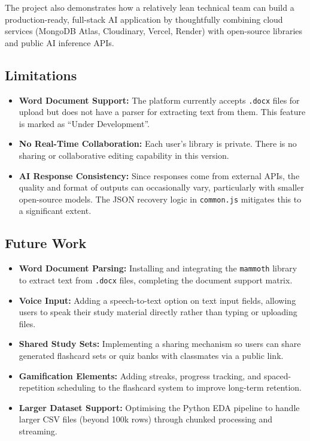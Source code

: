 \documentclass[12pt,a4paper]{article}
\begin{document}
The project also demonstrates how a relatively lean technical team can build a production-ready, full-stack AI application by thoughtfully combining cloud services (MongoDB Atlas, Cloudinary, Vercel, Render) with open-source libraries and public AI inference APIs.

\subsection{Limitations}

\begin{itemize}
    \item \textbf{Word Document Support:} The platform currently accepts \texttt{.docx} files for upload but does not have a parser for extracting text from them. This feature is marked as ``Under Development''.
    \item \textbf{No Real-Time Collaboration:} Each user's library is private. There is no sharing or collaborative editing capability in this version.
    \item \textbf{AI Response Consistency:} Since responses come from external APIs, the quality and format of outputs can occasionally vary, particularly with smaller open-source models. The JSON recovery logic in \texttt{common.js} mitigates this to a significant extent.
\end{itemize}

\subsection{Future Work}

\begin{itemize}
    \item \textbf{Word Document Parsing:} Installing and integrating the \texttt{mammoth} library to extract text from \texttt{.docx} files, completing the document support matrix.
    \item \textbf{Voice Input:} Adding a speech-to-text option on text input fields, allowing users to speak their study material directly rather than typing or uploading files.
    \item \textbf{Shared Study Sets:} Implementing a sharing mechanism so users can share generated flashcard sets or quiz banks with classmates via a public link.
    \item \textbf{Gamification Elements:} Adding streaks, progress tracking, and spaced-repetition scheduling to the flashcard system to improve long-term retention.
    \item \textbf{Larger Dataset Support:} Optimising the Python EDA pipeline to handle larger CSV files (beyond 100k rows) through chunked processing and streaming.
\end{itemize}
\end{document}
